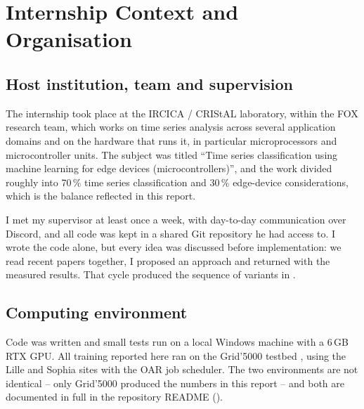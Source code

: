 %

\section{Internship Context and Organisation}
\label{app:internship}

\subsection{Host institution, team and supervision}
\label{app:host}

The internship took place at the IRCICA / CRIStAL laboratory, within the FOX research team, which
works on time series analysis across several application domains and on the hardware that runs it,
in particular microprocessors and microcontroller units. The subject was titled ``Time series
classification using machine learning for edge devices (microcontrollers)'', and the work divided
roughly into 70\,\% time series classification and 30\,\% edge-device considerations, which is the
balance reflected in this report.

I met my supervisor at least once a week, with day-to-day communication over Discord, and all code
was kept in a shared Git repository he had access to. I wrote the code alone, but every idea was
discussed before implementation: we read recent papers together, I proposed an approach and returned
with the measured results. That cycle produced the sequence of variants in .

\subsection{Computing environment}
\label{app:context:compute}

Code was written and small tests run on a local Windows machine with a 6\,GB RTX GPU. All training
reported here ran on the Grid'5000 testbed \citep{balouek2013grid5000}, using the Lille and Sophia
sites with the OAR job scheduler. The two environments are not identical -- only Grid'5000 produced
the numbers in this report -- and both are documented in full in the repository README
().

